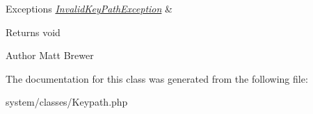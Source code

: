 \begin{DoxyExceptions}{Exceptions}
{\em \hyperlink{class_invalid_key_path_exception}{InvalidKeyPathException}} & \\
\hline
\end{DoxyExceptions}
\begin{DoxyReturn}{Returns}
void 
\end{DoxyReturn}
\begin{DoxyAuthor}{Author}
Matt Brewer 
\end{DoxyAuthor}


The documentation for this class was generated from the following file:\begin{DoxyCompactItemize}
\item 
system/classes/Keypath.php\end{DoxyCompactItemize}
